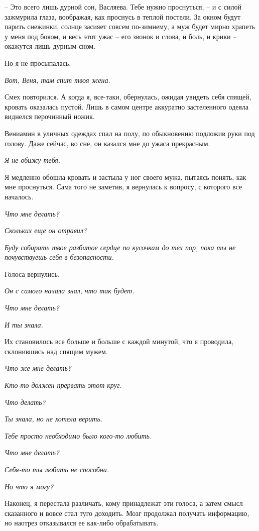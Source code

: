 \documentclass[
]{book}
\begin{document}
-- Это всего лишь дурной сон, Васляева. Тебе нужно проснуться, -- и с силой зажмурила глаза, воображая, как проснусь в теплой постели. За окном будут парить снежинки, солнце засияет совсем по-зимнему, а муж будет мирно храпеть у меня под боком, и весь этот ужас -- его звонок и слова, и боль, и крики -- окажутся лишь дурным сном.

Но я не просыпалась.

\emph{Вот, Веня, там спит твоя жена.}

Смех повторился. А когда я, все-таки, обернулась, ожидая увидеть себя спящей, кровать оказалась пустой. Лишь в самом центре аккуратно застеленного одеяла виднелся перочинный ножик.

Вениамин в уличных одеждах спал на полу, по обыкновению подложив руки под голову. Даже сейчас, во сне, он казался мне до ужаса прекрасным.

\emph{Я не обижу тебя.}

Я медленно обошла кровать и застыла у ног своего мужа, пытаясь понять, как мне проснуться. Сама того не заметив, я вернулась к вопросу, с которого все началось.

\emph{Что мне делать?}

\emph{Скольких еще он отравил?}

\emph{Буду собирать твое разбитое сердце по кусочкам до тех пор, пока ты не почувствуешь себя в безопасности.}

Голоса вернулись.

\emph{Он с самого начала знал, что так будет.}

\emph{Что мне делать?}

\emph{И ты знала.}

Их становилось все больше и больше с каждой минутой, что я проводила, склонившись над спящим мужем.

\emph{Что же мне делать?}

\emph{Кто-то должен прервать этот круг.}

\emph{Что делать?}

\emph{Ты знала, но не хотела верить.}

\emph{Тебе просто необходимо было кого-то любить.}

\emph{Что мне делать?}

\emph{Себя-то ты любить не способна.}

\emph{Но что я могу?}

Наконец, я перестала различать, кому принадлежат эти голоса, а затем смысл сказанного и вовсе стал туго доходить. Мозг продолжал получать информацию, но наотрез отказывался ее как-либо обрабатывать.
\end{document}
